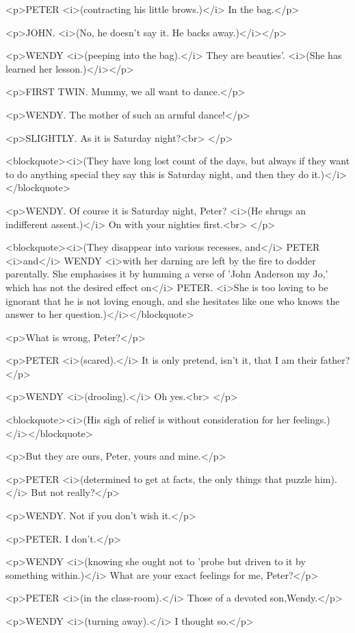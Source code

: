 <p>PETER <i>(contracting his little brows.)</i> In the bag.</p>

<p>JOHN. <i>(No, he doesn't say it. He backs away.)</i></p>

<p>WENDY <i>(peeping into the bag).</i> They are beauties'. <i>(She
has learned her lesson.)</i></p>

<p>FIRST TWIN. Mummy, we all want to dance.</p>

<p>WENDY. The mother of such an armful dance!</p>

<p>SLIGHTLY. As it is Saturday night?<br>
</p>

<blockquote><i>(They have long lost count of the days, but always if
they want to do anything special they say this is Saturday night, and
then they do it.)</i></blockquote>

<p>WENDY. Of course it is Saturday night, Peter? <i>(He shrugs an
indifferent assent.)</i> On with your nighties first.<br>
</p>

<blockquote><i>(They disappear into various recesses, and</i> PETER
<i>and</i> WENDY <i>with her darning are left by the fire to dodder
parentally. She emphasises it by humming a verse of 'John Anderson my
Jo,' which has not the desired effect on</i> PETER. <i>She is too
loving to be ignorant that he is not loving enough, and she hesitates
like one who knows the answer to her question.)</i></blockquote>

<p>What is wrong, Peter?</p>

<p>PETER <i>(scared).</i> It is only pretend, isn't it, that I am
their father?</p>

<p>WENDY <i>(drooling).</i> Oh yes.<br>
</p>

<blockquote><i>(His sigh of relief is without consideration for her
feelings.)</i></blockquote>

<p>But they are ours, Peter, yours and mine.</p>

<p>PETER <i>(determined to get at facts, the only things that puzzle
him).</i> But not really?</p>

<p>WENDY. Not if you don't wish it.</p>

<p>PETER. I don't.</p>

<p>WENDY <i>(knowing she ought not to 'probe but driven to it by
something within.)</i> What are your exact feelings for me,
Peter?</p>

<p>PETER <i>(in the class-room).</i> Those of a devoted
son,Wendy.</p>

<p>WENDY <i>(turning away).</i> I thought so.</p>

